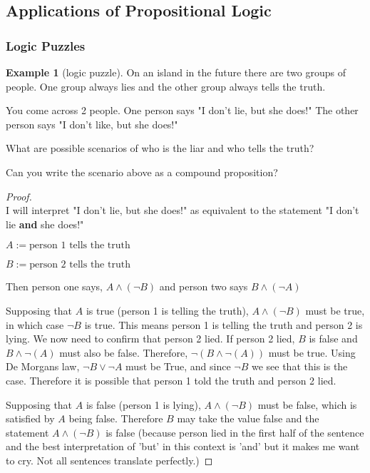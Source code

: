 \documentclass[letterpaper,10pt]{article}
\theoremstyle{plain}
\theoremstyle{definition}
\newtheorem{exmp}[thm]{Example}
\theoremstyle{remark}
\providecommand{\land}{\ensuremath{\wedge}}
\providecommand{\lor}{\ensuremath{\vee}}
\begin{document}
\newpage
\subsection{Applications of Propositional Logic}

\subsubsection{Logic Puzzles}
\begin{exmp}[logic puzzle]

On an island in the future there are two groups of people. One group always lies and the other group always tells the truth.

You come across 2 people.
One person says "I don't lie, but she does!"
The other person says "I don't like, but she does!"

What are possible scenarios of who is the liar and who tells the truth?

Can you write the scenario above as a compound proposition?

\begin{proof} \ \\
I will interpret "I don't lie, but she does!" as equivalent to the statement "I don't lie \textbf{and} she does!"

$A:=\text{person 1 tells the truth}$

$B:=\text{person 2 tells the truth}$

Then person one says, $A\land (\lnot B)$
and person two says $B\land (\lnot A)$

Supposing that $A$ is true (person 1 is telling the truth), $A\land (\lnot B)$ must be true, in which case $\lnot B $ is true. This means person 1 is telling the truth and person 2 is lying. 
We now need to confirm that person 2 lied. If person 2 lied, $B$ is false and $B \land \lnot(A)$ must also be false. Therefore, $\lnot(B \land \lnot(A))$ must be true. Using De Morgans law, $\lnot B \lor \lnot A$ must be True, and since $\lnot B$ we see that this is the case. Therefore it is possible that person 1 told the truth and person 2 lied.

Supposing that $A$ is false (person 1 is lying), $A\land (\lnot B)$ must be false, which is satisfied by $A$ being false. Therefore $B$ may take the value false and the statement $A\land (\lnot B)$ is false (because person lied in the first half of the sentence and the best interpretation of 'but' in this context is 'and' but it makes me want to cry. Not all sentences translate perfectly.)

\end{proof}

\end{exmp}
\end{document}
